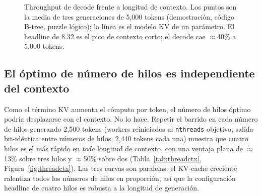 \documentclass[10pt,a4paper]{article}
\begin{document}
\begin{figure}[H]
\centering
{}
\caption{Throughput de decode frente a longitud de contexto. Los puntos son la media de tres generaciones de 5{,}000 tokens (demostración, código B-tree, puzzle lógico); la línea es el modelo KV de un parámetro. El headline de 8.32 es el pico de contexto corto; el decode cae $\approx$40\% a 5{,}000 tokens.}
\label{fig:context}
\end{figure}

\subsection{El óptimo de número de hilos es independiente del contexto}
\label{sec:threadcontext}
Como el término KV aumenta el cómputo por token, el número de hilos óptimo podría desplazarse con el contexto. No lo hace. Repetir el barrido en cada número de hilos generando 2{,}500 tokens (workers reiniciados al \texttt{nthreads} objetivo; salida bit-idéntica entre números de hilos, 2{,}440 tokens cada una) muestra que cuatro hilos es el más rápido en \emph{toda} longitud de contexto, con una ventaja plana de $\approx$13\% sobre tres hilos y $\approx$50\% sobre dos (Tabla~\ref{tab:threadctx}, Figura~\ref{fig:threadctx}). Las tres curvas son paralelas: el KV-cache creciente ralentiza todos los números de hilos en proporción, así que la configuración headline de cuatro hilos es robusta a la longitud de generación.
\end{document}
